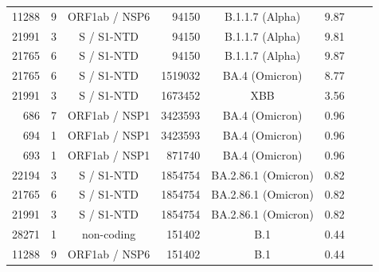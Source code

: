 \documentclass[12pt]{article}
\begin{document}
\begin{table}[h]
\begin{tabular}{rccrcrrc}
11288 & 9 & ORF1ab / NSP6 & 94150 & B.1.1.7 (Alpha) & 9.87 & \cite{RambautAlpha2020} \\
21991 & 3 & S / S1-NTD & 94150 & B.1.1.7 (Alpha) & 9.81 & \cite{RambautAlpha2020} \\
21765 & 6 & S / S1-NTD & 94150 & B.1.1.7 (Alpha) & 9.87 & \cite{RambautAlpha2020} \\
21765 & 6 & S / S1-NTD & 1519032 & BA.4 (Omicron) & 8.77 & \cite{Tegally2022} \\
21991 & 3 & S / S1-NTD & 1673452 & XBB & 3.56 & \cite{Tamura2023} \\
686 & 7 & ORF1ab / NSP1 & 3423593 & BA.4 (Omicron) & 0.96 &  \\
694 & 1 & ORF1ab / NSP1 & 3423593 & BA.4 (Omicron) & 0.96 &  \\
693 & 1 & ORF1ab / NSP1 & 871740 & BA.4 (Omicron) & 0.96 &  \\
22194 & 3 & S / S1-NTD & 1854754 & BA.2.86.1 (Omicron) & 0.82 & \cite{Planas2024} \\
21765 & 6 & S / S1-NTD & 1854754 & BA.2.86.1 (Omicron) & 0.82 & \cite{Planas2024} \\
21991 & 3 & S / S1-NTD & 1854754 & BA.2.86.1 (Omicron) & 0.82 & \cite{Planas2024} \\
28271 & 1 & non-coding & 151402 & B.1 & 0.44 &  \\
11288 & 9 & ORF1ab / NSP6 & 151402 & B.1 & 0.44 &  \\
\bottomrule
\end{tabular}
\end{table}
\end{document}
